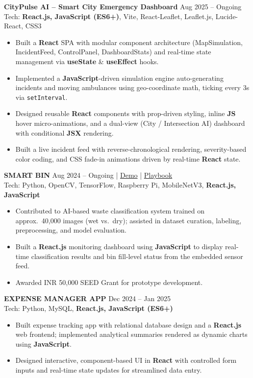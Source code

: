 \documentclass[10pt,a4paper]{article}
\begin{document}
\textbf{CityPulse AI -- Smart City Emergency Dashboard} \hfill Aug 2025 -- Ongoing \\[2pt]
Tech: \textbf{React.js, JavaScript (ES6+)}, Vite, React-Leaflet, Leaflet.js, Lucide-React, CSS3
\begin{itemize}
    \item Built a \textbf{React} SPA with modular component architecture (MapSimulation, IncidentFeed, ControlPanel, DashboardStats) and real-time state management via \textbf{useState} \& \textbf{useEffect} hooks.
    \item Implemented a \textbf{JavaScript}-driven simulation engine auto-generating incidents and moving ambulances using geo-coordinate math, ticking every 3s via \texttt{setInterval}.
    \item Designed reusable \textbf{React} components with prop-driven styling, inline \textbf{JS} hover micro-animations, and a dual-view (City / Intersection AI) dashboard with conditional \textbf{JSX} rendering.
    \item Built a live incident feed with reverse-chronological rendering, severity-based color coding, and CSS fade-in animations driven by real-time \textbf{React} state.
\end{itemize}

\vspace{2pt}\noindent
\textbf{SMART BIN} \hfill Aug 2024 -- Ongoing | \href{https://drive.google.com/file/d/1f-Q_tfywtCbI2DWZPfFyu9e8Epw-IqE5/view}{Demo} | \href{https://drive.google.com/file/d/1KBs5fB0WU-_Qa1MsJnE2XjwC2J1C-yBp/view}{Playbook} \\[2pt]
Tech: Python, OpenCV, TensorFlow, Raspberry Pi, MobileNetV3, \textbf{React.js, JavaScript}
\begin{itemize}
    \item Contributed to AI-based waste classification system trained on approx.\ 40,000 images (wet vs.\ dry); assisted in dataset curation, labeling, preprocessing, and model evaluation.
    \item Built a \textbf{React.js} monitoring dashboard using \textbf{JavaScript} to display real-time classification results and bin fill-level status from the embedded sensor feed.
    \item Awarded INR 50,000 SEED Grant for prototype development.
\end{itemize}

\vspace{2pt}\noindent
\textbf{EXPENSE MANAGER APP} \hfill Dec 2024 -- Jan 2025 \\[2pt]
Tech: Python, MySQL, \textbf{React.js, JavaScript (ES6+)}
\begin{itemize}
    \item Built expense tracking app with relational database design and a \textbf{React.js} web frontend; implemented analytical summaries rendered as dynamic charts using \textbf{JavaScript}.
    \item Designed interactive, component-based UI in \textbf{React} with controlled form inputs and real-time state updates for streamlined data entry.
\end{itemize}
\end{document}
